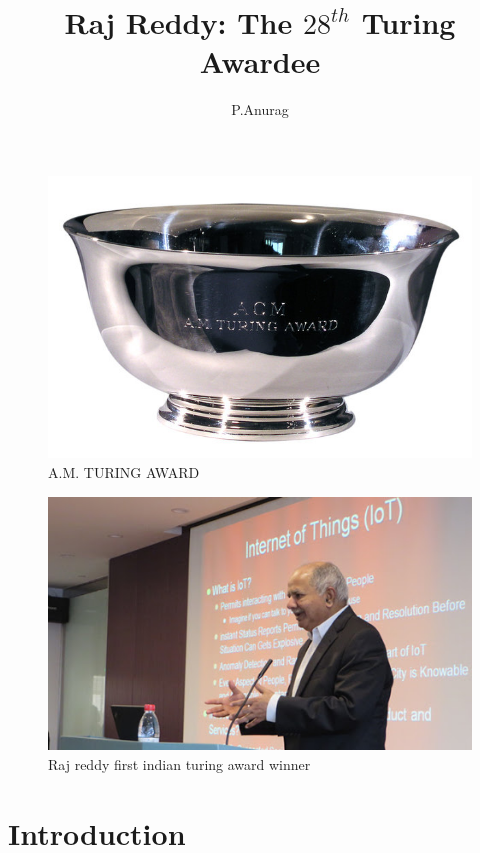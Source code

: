 \documentclass[a4paper,10pt]{article}
\title{Raj Reddy: The $ 28^{th} $ Turing Awardee}
\author{P.Anurag}
\begin{document}
\maketitle

\begin{figure}[!hbt]
 \centering
 \includegraphics[scale=0.65]{turing_bowl.jpg}
 \caption{A.M. TURING AWARD}
\end{figure}
\newpage

\tableofcontents

\begin{figure}[!htb]
 \centering
 \includegraphics[scale=0.75]{raj1.jpg}
 \caption{Raj reddy first indian turing award winner}
\end{figure}

\newpage
  
\section{Introduction}
\end{document}

